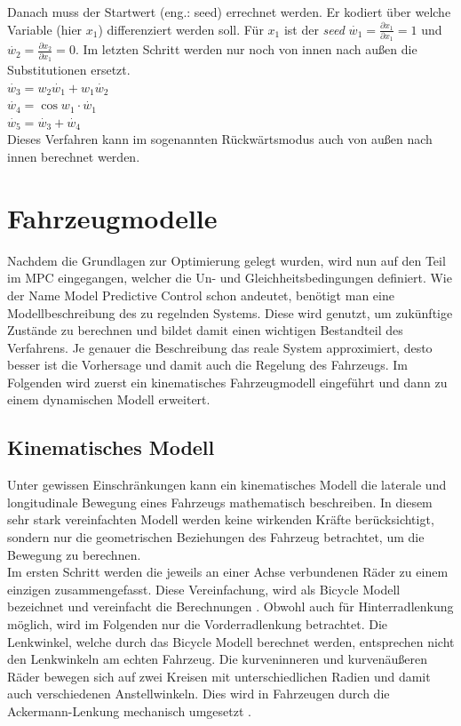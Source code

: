 \documentclass{like}
\begin{document}
Danach muss der Startwert (eng.: seed) errechnet werden. Er kodiert über welche Variable (hier $x_1$) differenziert werden soll. Für $x_1$ ist der \textit{seed} $\dot{w_1} = \frac{\partial x_1}{\partial x_1} = 1$ und   $\dot{w_2} = \frac{\partial x_2}{\partial x_1} = 0$.
Im letzten Schritt werden nur noch von innen nach außen die Substitutionen ersetzt. \\
$\dot{w_3} = w_2\dot{w_1} + w_1 \dot{w_2}$ \\
$\dot{w_4} = \cos{w_1} \cdot \dot{w_1}$ \\
$\dot{w_5} = \dot{w_3} + \dot{w_4}$ \\
Dieses Verfahren kann im sogenannten Rückwärtsmodus auch von außen nach innen berechnet werden.  

\newpage
\section{Fahrzeugmodelle}
Nachdem die Grundlagen zur Optimierung gelegt wurden, wird nun auf den Teil im \ac{MPC} eingegangen, welcher die Un- und Gleichheitsbedingungen definiert.
Wie der Name Model Predictive Control schon andeutet, benötigt man eine Modellbeschreibung des zu regelnden Systems. Diese wird genutzt, um zukünftige Zustände zu berechnen und bildet damit einen wichtigen Bestandteil des Verfahrens. Je genauer die Beschreibung das reale System approximiert, desto besser ist die Vorhersage und damit auch die Regelung des Fahrzeugs.
Im Folgenden wird zuerst ein kinematisches Fahrzeugmodell eingeführt und dann zu einem dynamischen Modell erweitert.   

\subsection{Kinematisches Modell}
\label{kinematicModel}
Unter gewissen Einschränkungen kann ein kinematisches Modell die laterale und longitudinale Bewegung eines Fahrzeugs mathematisch beschreiben. In diesem sehr stark vereinfachten Modell werden keine wirkenden Kräfte berücksichtigt, sondern nur die geometrischen Beziehungen des Fahrzeug betrachtet, um die Bewegung zu berechnen. \\
Im ersten Schritt werden die jeweils an einer Achse verbundenen Räder zu einem einzigen zusammengefasst. Diese Vereinfachung, wird als Bicycle Modell bezeichnet und vereinfacht die Berechnungen \cite{BicycleModel}. Obwohl auch für Hinterradlenkung möglich, wird im Folgenden nur die Vorderradlenkung betrachtet. Die Lenkwinkel, welche durch das Bicycle Modell berechnet werden, entsprechen nicht den Lenkwinkeln am echten Fahrzeug. Die kurveninneren und kurvenäußeren Räder bewegen sich auf zwei Kreisen mit unterschiedlichen Radien und damit auch verschiedenen Anstellwinkeln. Dies wird in Fahrzeugen durch die Ackermann-Lenkung mechanisch umgesetzt \cite{rajamani2011vehicle}.
\end{document}
